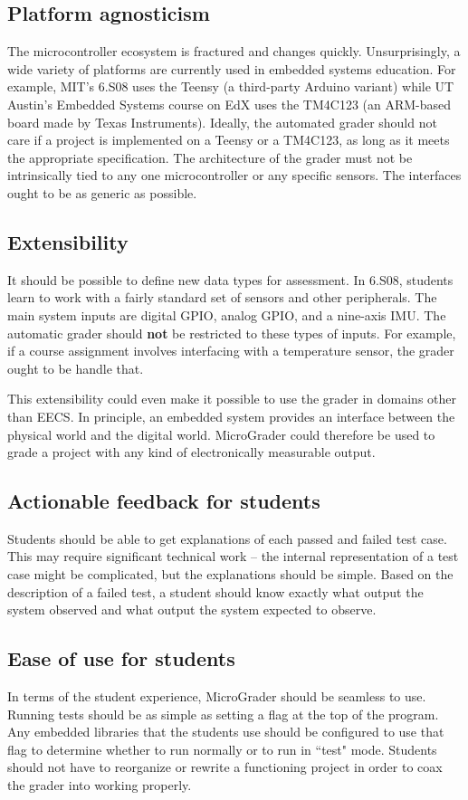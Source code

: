 \documentclass[12pt]{article}
\begin{document}
\subsection{Platform agnosticism}
\indent \indent The microcontroller ecosystem is fractured and changes quickly.  Unsurprisingly, a wide variety of platforms are currently used in embedded systems education.  For example, MIT's 6.S08 uses the Teensy (a third-party Arduino variant) while UT Austin's Embedded Systems course on EdX uses the TM4C123 (an ARM-based board made by Texas Instruments).  Ideally, the automated grader should not care if a project is implemented on a Teensy or a TM4C123, as long as it meets the appropriate specification. The architecture of the grader must not be intrinsically tied to any one microcontroller or any specific sensors.  The interfaces ought to be as generic as possible.

\subsection{Extensibility}
\indent \indent It should be possible to define new data types for assessment.  In 6.S08, students learn to work with a fairly standard set of sensors and other peripherals.  The main system inputs are digital GPIO, analog GPIO, and a nine-axis IMU.  The automatic grader should \textbf{not} be restricted to these types of inputs.  For example, if a course assignment involves interfacing with a temperature sensor, the grader ought to be handle that.

This extensibility could even make it possible to use the grader in domains other than EECS.  In principle, an embedded system provides an interface between the physical world and the digital world.  MicroGrader could therefore be used to grade a project with any kind of electronically measurable output.

\subsection{Actionable feedback for students}
\indent \indent Students should be able to get explanations of each passed and failed test case.  This may require significant technical work -- the internal representation of a test case might be complicated, but the explanations should be simple.  Based on the description of a failed test, a student should know exactly what output the system observed and what output the system expected to observe.

\subsection{Ease of use for students}
In terms of the student experience, MicroGrader should be seamless to use.  Running tests should be as simple as setting a flag at the top of the program.  Any embedded libraries that the students use should be configured to use that flag to determine whether to run normally or to run in ``test" mode.  Students should not have to reorganize or rewrite a functioning project in order to coax the grader into working properly.
\end{document}
